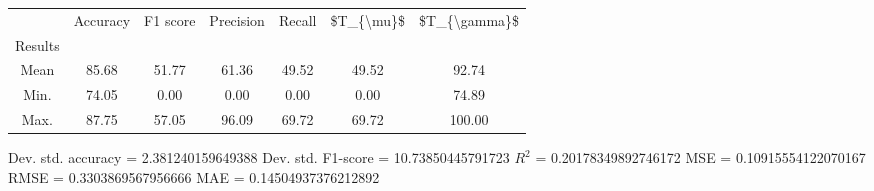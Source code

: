 \begin{tabular}{|c|c|c|c|c|c|c|}
\toprule
{} &  Accuracy &  F1 score &  Precision &  Recall &  \$T\_\{\textbackslash mu\}\$ &  \$T\_\{\textbackslash gamma\}\$ \\
Results &           &           &            &         &            &               \\
\hline
Mean    &     85.68 &     51.77 &      61.36 &   49.52 &      49.52 &         92.74 \\
Min.    &     74.05 &      0.00 &       0.00 &    0.00 &       0.00 &         74.89 \\
Max.    &     87.75 &     57.05 &      96.09 &   69.72 &      69.72 &        100.00 \\
\bottomrule
\end{tabular}

 Dev. std. accuracy = 2.381240159649388
 Dev. std. F1-score = 10.73850445791723
 $R^2$ = 0.20178349892746172
 MSE = 0.10915554122070167
 RMSE = 0.3303869567956666
 MAE = 0.14504937376212892